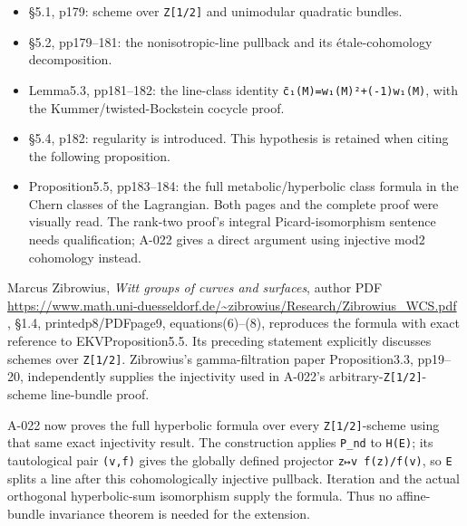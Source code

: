 \documentclass[
  10pt,
]{article}
\providecommand{\tightlist}{%
  \setlength{\itemsep}{0pt}\setlength{\parskip}{0pt}}
\providecommand{\tightlist}{\setlength{\itemsep}{0pt}\setlength{\parskip}{0pt}}
\begin{document}
\begin{itemize}
\tightlist
\item
  §5.1, p179: scheme over
  \texttt{\small Z[\allowbreak{}1/\allowbreak{}2]\allowbreak{}} and
  unimodular quadratic bundles.
\item
  §5.2, pp179--181: the nonisotropic-line pullback and its
  étale-cohomology decomposition.
\item
  Lemma5.3, pp181--182: the line-class identity
  \texttt{\small c̄₁(\allowbreak{}M)\allowbreak{}=\allowbreak{}w₁(\allowbreak{}M)\allowbreak{}²+\allowbreak{}(\allowbreak{}-\allowbreak{}1)\allowbreak{}w₁(\allowbreak{}M)\allowbreak{}},
  with the Kummer/twisted-Bockstein cocycle proof.
\item
  §5.4, p182: regularity is introduced. This hypothesis is retained when
  citing the following proposition.
\item
  Proposition5.5, pp183--184: the full metabolic/hyperbolic class
  formula in the Chern classes of the Lagrangian. Both pages and the
  complete proof were visually read. The rank-two proof's integral
  Picard-isomorphism sentence needs qualification; A-022 gives a direct
  argument using injective mod2 cohomology instead.
\end{itemize}

Marcus Zibrowius, \emph{Witt groups of curves and surfaces}, author PDF
\url{https://www.math.uni-duesseldorf.de/~zibrowius/Research/Zibrowius_WCS.pdf}
, §1.4, printedp8/PDFpage9, equations(6)--(8), reproduces the formula
with exact reference to EKVProposition5.5. Its preceding statement
explicitly discusses schemes over
\texttt{\small Z[\allowbreak{}1/\allowbreak{}2]\allowbreak{}}.
Zibrowius's gamma-filtration paper Proposition3.3, pp19--20,
independently supplies the injectivity used in A-022's
arbitrary-\texttt{\small Z[\allowbreak{}1/\allowbreak{}2]\allowbreak{}}-scheme
line-bundle proof.

A-022 now proves the full hyperbolic formula over every
\texttt{\small Z[\allowbreak{}1/\allowbreak{}2]\allowbreak{}}-scheme
using that same exact injectivity result. The construction applies
\texttt{\small P\_\allowbreak{}nd} to
\texttt{\small H(\allowbreak{}E)\allowbreak{}}; its tautological pair
\texttt{\small (\allowbreak{}v,\allowbreak{}f)\allowbreak{}} gives the
globally defined projector
\texttt{\small z↦v f(\allowbreak{}z)\allowbreak{}/\allowbreak{}f(\allowbreak{}v)\allowbreak{}},
so \texttt{\small E} splits a line after this cohomologically injective
pullback. Iteration and the actual orthogonal hyperbolic-sum isomorphism
supply the formula. Thus no affine-bundle invariance theorem is needed
for the extension.
\end{document}
